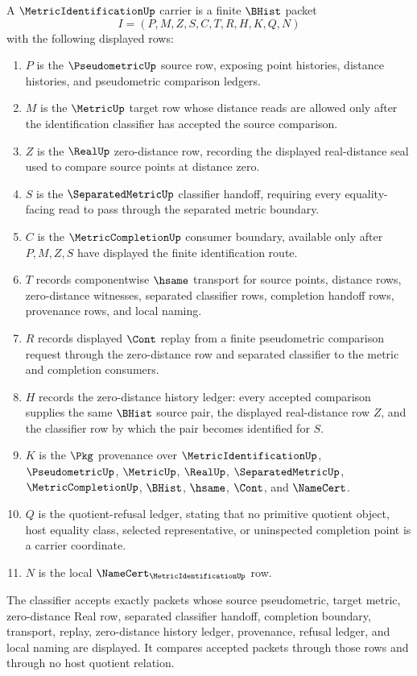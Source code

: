 \begin{definition}
\label{def:metric-identification-carrier}
A $\MetricIdentificationUp$ carrier is a finite $\BHist$ packet
$$
I=(P,M,Z,S,C,T,R,H,K,Q,N)
$$
with the following displayed rows:
\begin{enumerate}
\item $P$ is the $\PseudometricUp$ source row, exposing point histories, distance histories, and pseudometric comparison ledgers.
\item $M$ is the $\MetricUp$ target row whose distance reads are allowed only after the identification classifier has accepted the source comparison.
\item $Z$ is the $\RealUp$ zero-distance row, recording the displayed real-distance seal used to compare source points at distance zero.
\item $S$ is the $\SeparatedMetricUp$ classifier handoff, requiring every equality-facing read to pass through the separated metric boundary.
\item $C$ is the $\MetricCompletionUp$ consumer boundary, available only after $P,M,Z,S$ have displayed the finite identification route.
\item $T$ records componentwise $\hsame$ transport for source points, distance rows, zero-distance witnesses, separated classifier rows, completion handoff rows, provenance rows, and local naming.
\item $R$ records displayed $\Cont$ replay from a finite pseudometric comparison request through the zero-distance row and separated classifier to the metric and completion consumers.
\item $H$ records the zero-distance history ledger: every accepted comparison supplies the same $\BHist$ source pair, the displayed real-distance row $Z$, and the classifier row by which the pair becomes identified for $S$.
\item $K$ is the $\Pkg$ provenance over $\MetricIdentificationUp$, $\PseudometricUp$, $\MetricUp$, $\RealUp$, $\SeparatedMetricUp$, $\MetricCompletionUp$, $\BHist$, $\hsame$, $\Cont$, and $\NameCert$.
\item $Q$ is the quotient-refusal ledger, stating that no primitive quotient object, host equality class, selected representative, or uninspected completion point is a carrier coordinate.
\item $N$ is the local $\NameCert_{\MetricIdentificationUp}$ row.
\end{enumerate}
The classifier accepts exactly packets whose source pseudometric, target metric, zero-distance Real row, separated classifier handoff, completion boundary, transport, replay, zero-distance history ledger, provenance, refusal ledger, and local naming are displayed. It compares accepted packets through those rows and through no host quotient relation.
\end{definition}

